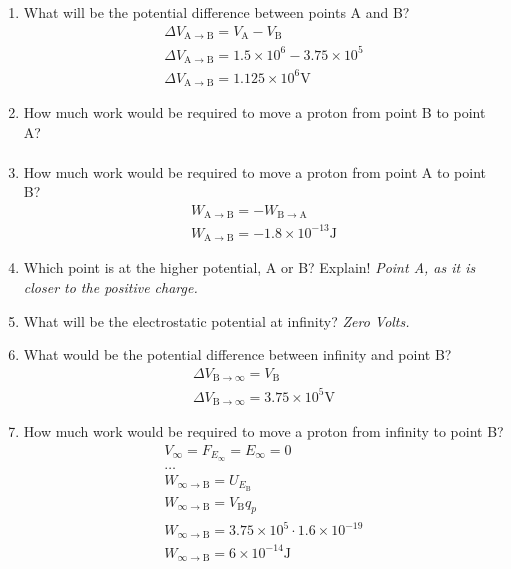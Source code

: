 \documentclass[12pt]{article}
\begin{document}
\begin{enumerate}
\begin{enumerate}
  \item What will be the potential difference between points A and B?
    \begin{align}
      \Delta V_{\mathrm{A} \to \mathrm{B}} = V_{\mathrm{A}} - V_{\mathrm{B}} \\
      \Delta V_{\mathrm{A} \to \mathrm{B}} = 1.5 \times 10^{6} - 3.75 \times 10^{5} \\
      \Delta V_{\mathrm{A} \to \mathrm{B}} = 1.125 \times 10^{6} \mathrm{V}
    \end{align}

  \item How much work would be required to move a proton from point B to point A?
    \begin{align}
    \end{align}

  \item How much work would be required to move a proton from point A to point B?
    \begin{align}
      W_{\mathrm{A} \to \mathrm{B}} = -W_{\mathrm{B} \to \mathrm{A}} \\
      W_{\mathrm{A} \to \mathrm{B}} = -1.8 \times 10^{-13} \mathrm{J}
    \end{align}

  \item Which point is at the higher potential, A or B? Explain!
    \textit{Point A, as it is closer to the positive charge.}

  \item What will be the electrostatic potential at infinity?
    \textit{Zero Volts.}

  \item What would be the potential difference between infinity and point B?
    \begin{align}
      \Delta V_{\mathrm{B} \to \infty} = V_{\mathrm{B}} \\
      \Delta V_{\mathrm{B} \to \infty} = 3.75 \times 10^{5} \mathrm{V}
    \end{align}

  \item How much work would be required to move a proton from infinity to point B?
    \begin{align}
      V_{\infty} = F_{E_{\infty}} = E_{\infty} = 0 \\
      \dots \\
      W_{\infty \to \mathrm{B}} = U_{E_{\mathrm{B}}} \\
      W_{\infty \to \mathrm{B}} = V_{\mathrm{B}} q_{p} \\
      W_{\infty \to \mathrm{B}} = 3.75 \times 10^{5} \cdot 1.6 \times 10^{-19} \\
      W_{\infty \to \mathrm{B}} = 6 \times 10^{-14} \mathrm{J} 
    \end{align}


\end{enumerate}
\end{enumerate}
\end{document}

